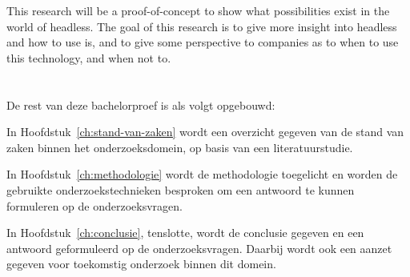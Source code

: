 This research will be a proof-of-concept to show what possibilities exist in the world of headless. The goal of this research is to give more insight into headless and how to use is, and to give some perspective to companies as to when to use this technology, and when not to.

\section{}
\label{sec:opzet-bachelorproef}


De rest van deze bachelorproef is als volgt opgebouwd:

In Hoofdstuk~\ref{ch:stand-van-zaken} wordt een overzicht gegeven van de stand van zaken binnen het onderzoeksdomein, op basis van een literatuurstudie.

In Hoofdstuk~\ref{ch:methodologie} wordt de methodologie toegelicht en worden de gebruikte onderzoekstechnieken besproken om een antwoord te kunnen formuleren op de onderzoeksvragen.


In Hoofdstuk~\ref{ch:conclusie}, tenslotte, wordt de conclusie gegeven en een antwoord geformuleerd op de onderzoeksvragen. Daarbij wordt ook een aanzet gegeven voor toekomstig onderzoek binnen dit domein.